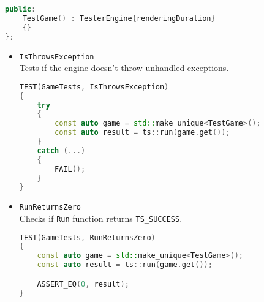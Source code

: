 \begin{itemize}
\begin{lstlisting}[language=c++, caption=\texttt{TestGame} class (./engine/tests/tester.cpp)]
public:
    TestGame() : TesterEngine{renderingDuration}
    {}
};
\end{lstlisting}
        \begin{itemize}
            \item \texttt{IsThrowsException}\\
            Tests if the engine doesn't throw unhandled exceptions.
\begin{lstlisting}[language=c++, caption=\texttt{IsThrowsException} test (./engine/tests/tester.cpp)]
TEST(GameTests, IsThrowsException)
{
    try
    {
        const auto game = std::make_unique<TestGame>();
        const auto result = ts::run(game.get());
    }
    catch (...)
    {
        FAIL();
    }
}
\end{lstlisting}
            \item \texttt{RunReturnsZero}\\
            Checks if \texttt{Run} function returns \texttt{TS\_SUCCESS}.
\begin{lstlisting}[language=c++, caption=\texttt{RunReturnsZero} test (./engine/tests/tester.cpp)]
TEST(GameTests, RunReturnsZero)
{
    const auto game = std::make_unique<TestGame>();
    const auto result = ts::run(game.get());

    ASSERT_EQ(0, result);
}
            \end{lstlisting}
        \end{itemize}
\end{itemize}